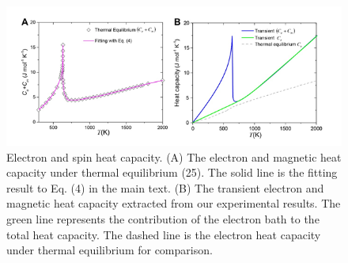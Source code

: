 \begin{figure}[htbp]
	\begin{center}
		\includegraphics[width=150mm]{figs/NiFigS8}
	\end{center}
	\caption{Electron and spin heat capacity. (A) The electron and magnetic heat capacity under thermal equilibrium (25). The solid line is the fitting result to Eq. (4) in the main text. (B) The transient electron and magnetic heat capacity extracted from our experimental results. The green line represents the contribution of the electron bath to the total heat capacity. The dashed line is the electron heat capacity under thermal equilibrium for comparison. }
	\label{fig: NiSIfig8}
\end{figure}

